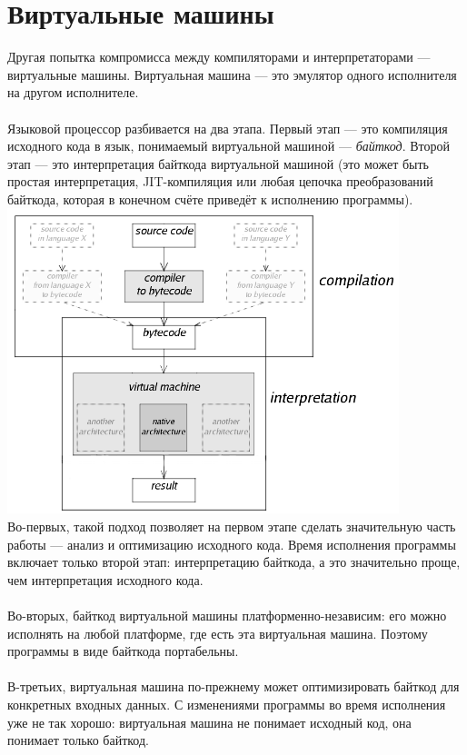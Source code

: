 \documentclass[11pt]{book}
\begin{document}
\section{Виртуальные машины}
Другая попытка компромисса между компиляторами и интерпретаторами --- виртуальные машины.
Виртуальная машина --- это эмулятор одного исполнителя на другом исполнителе.
\\ \\
Языковой процессор разбивается на два этапа.
Первый этап --- это компиляция исходного кода в язык, понимаемый виртуальной машиной --- \emph{байткод}.
Второй этап --- это интерпретация байткода виртуальной машиной (это может быть простая интерпретация, JIT-компиляция
или любая цепочка преобразований байткода, которая в конечном счёте приведёт к исполнению программы).
\\
\includegraphics[height=3.5in]{pic/vm.png}
\\
Во-первых, такой подход позволяет на первом этапе сделать значительную часть работы --- анализ и оптимизацию исходного кода.
Время исполнения программы включает только второй этап: интерпретацию байткода,
а это значительно проще, чем интерпретация исходного кода.
\\ \\
Во-вторых, байткод виртуальной машины платформенно-независим:
его можно исполнять на любой платформе, где есть эта виртуальная машина.
Поэтому программы в виде байткода портабельны.
\\ \\
В-третьих, виртуальная машина по-прежнему может оптимизировать байткод для конкретных входных данных.
С изменениями программы во время исполнения уже не так хорошо:
виртуальная машина не понимает исходный код, она понимает только байткод.
\end{document}
